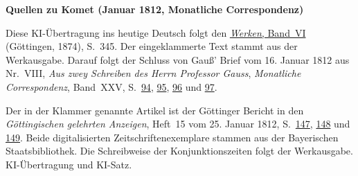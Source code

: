 \clearpage\thispagestyle{empty}
\begin{center}\textbf{Quellen zu Komet (Januar 1812, Monatliche Correspondenz)}\end{center}
\noindent Diese KI-Übertragung ins heutige Deutsch folgt den \href{https://gdz.sub.uni-goettingen.de/id/PPN236007467}{\textit{Werken}, Band~VI} (Göttingen, 1874), S.~345. Der eingeklammerte Text stammt aus der Werkausgabe. Darauf folgt der Schluss von Gauß’ Brief vom 16. Januar 1812 aus Nr.~VIII, \textit{Aus zwey Schreiben des Herrn Professor Gauss}, \textit{Monatliche Correspondenz}, Band~XXV, S.~\href{https://api.digitale-sammlungen.de/iiif/image/v2/bsb10538614_00100/full/1600,/0/default.jpg}{94}, \href{https://api.digitale-sammlungen.de/iiif/image/v2/bsb10538614_00101/full/1600,/0/default.jpg}{95}, \href{https://api.digitale-sammlungen.de/iiif/image/v2/bsb10538614_00102/full/1600,/0/default.jpg}{96} und \href{https://api.digitale-sammlungen.de/iiif/image/v2/bsb10538614_00103/full/1600,/0/default.jpg}{97}.
\par\smallskip\noindent Der in der Klammer genannte Artikel ist der Göttinger Bericht in den \textit{Göttingischen gelehrten Anzeigen}, Heft~15 vom 25. Januar 1812, S.~\href{https://api.digitale-sammlungen.de/iiif/image/v2/bsb10538681_00191/full/1600,/0/default.jpg}{147}, \href{https://api.digitale-sammlungen.de/iiif/image/v2/bsb10538681_00192/full/1600,/0/default.jpg}{148} und \href{https://api.digitale-sammlungen.de/iiif/image/v2/bsb10538681_00193/full/1600,/0/default.jpg}{149}. Beide digitalisierten Zeitschriftenexemplare stammen aus der Bayerischen Staatsbibliothek. Die Schreibweise der Konjunktionszeiten folgt der Werkausgabe. KI-Übertragung und KI-Satz.
\clearpage
